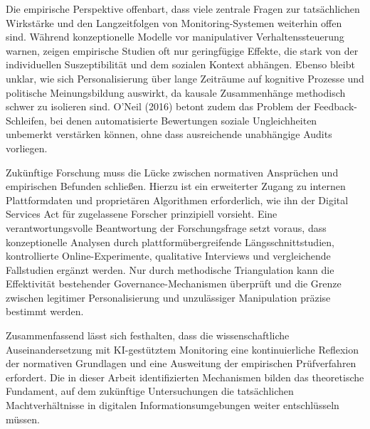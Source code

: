 Die empirische Perspektive offenbart, dass viele zentrale Fragen zur tatsächlichen Wirkstärke und den Langzeitfolgen von Monitoring-Systemen weiterhin offen sind. Während konzeptionelle Modelle vor manipulativer Verhaltenssteuerung warnen, zeigen empirische Studien oft nur geringfügige Effekte, die stark von der individuellen Suszeptibilität und dem sozialen Kontext abhängen. Ebenso bleibt unklar, wie sich Personalisierung über lange Zeiträume auf kognitive Prozesse und politische Meinungsbildung auswirkt, da kausale Zusammenhänge methodisch schwer zu isolieren sind. O'Neil (2016) betont zudem das Problem der Feedback-Schleifen, bei denen automatisierte Bewertungen soziale Ungleichheiten unbemerkt verstärken können, ohne dass ausreichende unabhängige Audits vorliegen.

Zukünftige Forschung muss die Lücke zwischen normativen Ansprüchen und empirischen Befunden schließen. Hierzu ist ein erweiterter Zugang zu internen Plattformdaten und proprietären Algorithmen erforderlich, wie ihn der Digital Services Act für zugelassene Forscher prinzipiell vorsieht. Eine verantwortungsvolle Beantwortung der Forschungsfrage setzt voraus, dass konzeptionelle Analysen durch plattformübergreifende Längsschnittstudien, kontrollierte Online-Experimente, qualitative Interviews und vergleichende Fallstudien ergänzt werden. Nur durch methodische Triangulation kann die Effektivität bestehender Governance-Mechanismen überprüft und die Grenze zwischen legitimer Personalisierung und unzulässiger Manipulation präzise bestimmt werden.

Zusammenfassend lässt sich festhalten, dass die wissenschaftliche Auseinandersetzung mit \ac{KI}-gestütztem Monitoring eine kontinuierliche Reflexion der normativen Grundlagen und eine Ausweitung der empirischen Prüfverfahren erfordert. Die in dieser Arbeit identifizierten Mechanismen bilden das theoretische Fundament, auf dem zukünftige Untersuchungen die tatsächlichen Machtverhältnisse in digitalen Informationsumgebungen weiter entschlüsseln müssen.
